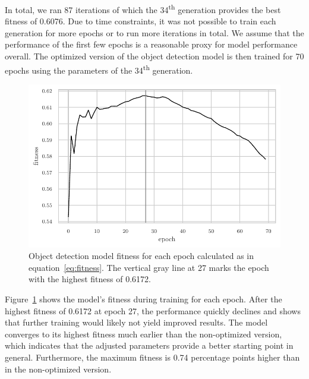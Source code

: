 \documentclass[final]{vutinfth} %
\begin{document}
In total, we ran \num{87} iterations of which the
\num{34}\textsuperscript{th} generation provides the best fitness of
\num{0.6076}. Due to time constraints, it was not possible to train
each generation for more epochs or to run more iterations in total. We
assume that the performance of the first few epochs is a reasonable
proxy for model performance overall. The optimized version of the
object detection model is then trained for \num{70} epochs using the
parameters of the \num{34}\textsuperscript{th} generation.

\begin{figure}
  \centering
  \includegraphics{graphics/model_fitness_final.pdf}
  \caption[Optimized object detection fitness per epoch.]{Object
    detection model fitness for each epoch calculated as in
    equation~\ref{eq:fitness}. The vertical gray line at \num{27}
    marks the epoch with the highest fitness of \num{0.6172}.}
  \label{fig:hyp-opt-fitness}
\end{figure}

Figure~\ref{fig:hyp-opt-fitness} shows the model's fitness during
training for each epoch. After the highest fitness of \num{0.6172} at
epoch \num{27}, the performance quickly declines and shows that
further training would likely not yield improved results. The model
converges to its highest fitness much earlier than the non-optimized
version, which indicates that the adjusted parameters provide a better
starting point in general. Furthermore, the maximum fitness is 0.74
percentage points higher than in the non-optimized version.
\end{document}
